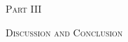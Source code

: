 \begin{titlepage}
  \centering
  \null\vfill
  {\fontsize{30pt}{50pt}\selectfont \textsc{\textcolor{UdesReussite}{Part III}}\par}
  \vspace{1cm}
  {\fontsize{25pt}{50pt} \textsc{Discussion and Conclusion}\par}

 \vfill\null
\end{titlepage}
